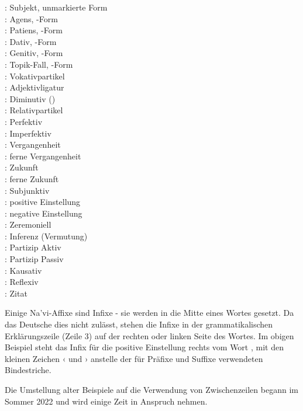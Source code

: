 \begin{multicols}{3}
	\noindent{}: Subjekt, unmarkierte Form \\
	: Agens, -Form \\
	: Patiens, -Form \\
	: Dativ, -Form \\
	: Genitiv, -Form \\
	: Topik-Fall, -Form \\
	: Vokativpartikel  \\
	: Adjektivligatur  \\
	: Diminutiv () \\
	: Relativpartikel  \\
	: Perfektiv \\
	: Imperfektiv \\
	: Vergangenheit \\
	: ferne Vergangenheit \\
	: Zukunft \\
	: ferne Zukunft \\
	: Subjunktiv \\
	: positive Einstellung \\
	: negative Einstellung \\
	: Zeremoniell \\
	: Inferenz (Vermutung) \\
	: Partizip Aktiv \\
	: Partizip Passiv \\
	: Kausativ \\
	: Reflexiv \\
	: Zitat 
\end{multicols}

\noindent Einige Na'vi-Affixe sind Infixe - sie werden in die Mitte eines Wortes gesetzt. Da das Deutsche dies nicht zulässt, stehen die Infixe in der grammatikalischen Erklärungszeile (Zeile 3) auf der rechten oder linken Seite des Wortes. Im obigen Beispiel steht das Infix für die positive Einstellung rechts vom Wort , mit den kleinen Zeichen ‹ und › anstelle der für Präfixe und Suffixe verwendeten Bindestriche.

Die Umstellung alter Beispiele auf die Verwendung von Zwischenzeilen begann im Sommer 2022 und wird einige Zeit in Anspruch nehmen.

